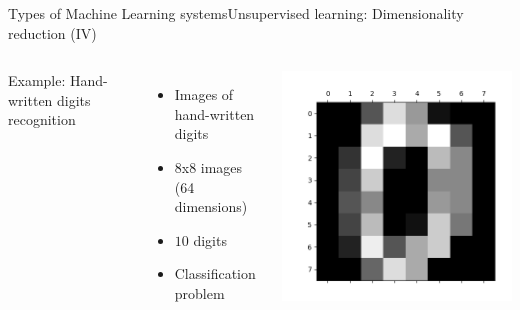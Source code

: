 \documentclass[10pt,compress]{beamer} %
\begin{document}
\begin{frame}[fragile]{Types of Machine Learning systems}{Unsupervised learning: Dimensionality reduction (IV)}
	\vspace{-0.5cm}
    \begin{columns}
		Example: Hand-written digits recognition
		\begin{itemize}
			\item Images of hand-written digits
			\item 8x8 images (64 dimensions)
			\item $10$ digits
			\item Classification problem
		\end{itemize}
			\includegraphics[width=\linewidth]{figs/zero.png}
    \end{columns}


\end{frame}
\end{document}
